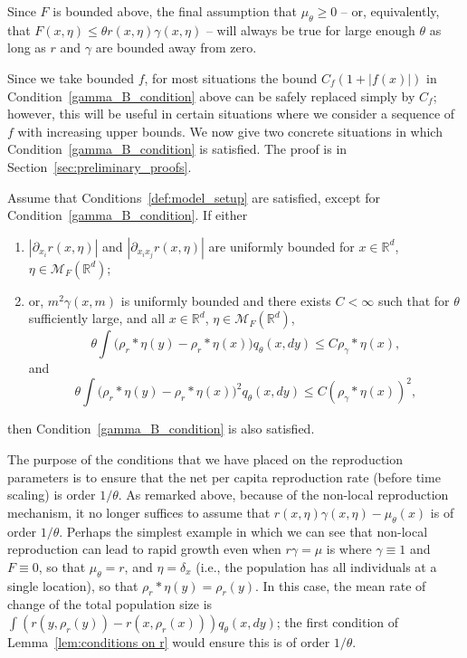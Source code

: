 \documentclass[EJP]{ejpecp} %
\newcommand{\IR}{\mathbb R}
\newcommand{\kernel}{\rho}  %
\newcommand{\smooth}[1]{\kernel_{#1} \! * \!}  %
\newcommand{\measures}{\mathcal{M}_F(\IR^d)} %
\begin{document}
Since $F$ is bounded above,
the final assumption that $\mu_\theta \ge 0$ --
or, equivalently, that $F(x,\eta) \le \theta r(x,\eta) \gamma(x,\eta)$ --
will always be true for large enough $\theta$ 
as long as $r$ and $\gamma$ are bounded away from zero.

Since we take bounded $f$,
for most situations the bound $C_f(1+|f(x)|)$ in Condition~\ref{gamma_B_condition} above
can be safely replaced simply by $C_f$;
however, this will be useful
in certain situations where we consider a sequence of $f$ with increasing upper bounds.
We now give two concrete situations in which Condition~\ref{gamma_B_condition} is satisfied.
The proof is in Section~\ref{sec:preliminary_proofs}.

\begin{lemma}
    \label{lem:conditions on r}
    Assume that Conditions~\ref{def:model_setup} are satisfied,
    except for Condition~\ref{gamma_B_condition}.
    If either
\begin{enumerate}
\item
\label{control through r} 
    $|\partial_{x_i}r(x,\eta)|$ and 
    $|\partial_{x_ix_j}r(x,\eta)|$
    are uniformly bounded for $x\in\IR^d$, $\eta\in\measures$;
\item 
\label{control through gamma}
    or, $m^2\gamma(x,m)$ is uniformly bounded and there exists $C<\infty$
    such that for $\theta$ sufficiently large, and all $x\in\IR^d$, $\eta\in\measures$,
    \[
    \theta\int\big(\smooth{r}\eta(y)-\smooth{r}\eta(x)\big)q_\theta(x,dy)\leq C\smooth{\gamma}\eta(x),
    \]
    and
    \[\theta\int\big(\smooth{r}\eta(y)-\smooth{r}\eta(x)\big)^2q_\theta(x,dy)
    \leq C(\smooth{\gamma}\eta(x))^2 ,
    \]
\end{enumerate} 
    then Condition~\ref{gamma_B_condition} is also satisfied.
\end{lemma}

The purpose of the conditions that we have placed on the reproduction parameters is to 
ensure that the net per capita reproduction rate (before time scaling)
is order $1/\theta$. As remarked above, 
because of the non-local reproduction mechanism, it no longer suffices 
to assume that 
$r(x,\eta)\gamma(x,\eta)-\mu_\theta(x)$ is of order $1/\theta$.
Perhaps the simplest example in which we can see
that non-local reproduction can lead to rapid growth even when $r\gamma=\mu$
is where $\gamma \equiv 1$ and $F \equiv 0$, so that $\mu_\theta = r$,
and $\eta = \delta_x$
(i.e., the population has all individuals at a single location),
so that $\smooth{r} \eta(y) = \rho_r(y)$.
In this case, the mean rate of change of the total population size
is $\int (r(y, \rho_r(y) ) - r(x, \rho_r(x))) q_\theta(x, dy)$;
the first condition of Lemma~\ref{lem:conditions on r} would ensure this is of order $1/\theta$.
\end{document}
